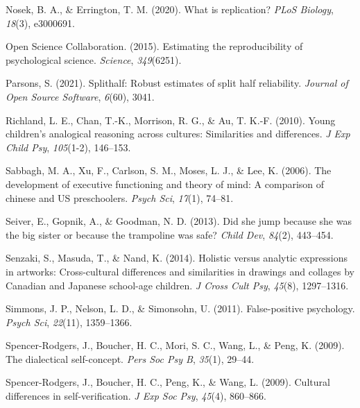\documentclass[
  man]{apa6}
\newlength{\cslhangindent}
\newlength{\cslentryspacingunit} %
\newenvironment{CSLReferences}[2] %
 {%
  \setlength{\parindent}{0pt}
  \ifodd #1
  \let\oldpar\par
  \def\par{\hangindent=\cslhangindent\oldpar}
  \fi
  \setlength{\parskip}{#2\cslentryspacingunit}
 }%
 {}
\begin{document}
\begin{CSLReferences}{1}{0}
\leavevmode{}%
Nosek, B. A., \& Errington, T. M. (2020). What is replication? \emph{PLoS Biology}, \emph{18}(3), e3000691.

\leavevmode{}%
Open Science Collaboration. (2015). Estimating the reproducibility of psychological science. \emph{Science}, \emph{349}(6251).

\leavevmode{}%
Parsons, S. (2021). Splithalf: Robust estimates of split half reliability. \emph{Journal of Open Source Software}, \emph{6}(60), 3041.

\leavevmode{}%
Richland, L. E., Chan, T.-K., Morrison, R. G., \& Au, T. K.-F. (2010). Young children's analogical reasoning across cultures: Similarities and differences. \emph{J Exp Child Psy}, \emph{105}(1-2), 146--153.

\leavevmode{}%
Sabbagh, M. A., Xu, F., Carlson, S. M., Moses, L. J., \& Lee, K. (2006). The development of executive functioning and theory of mind: A comparison of chinese and US preschoolers. \emph{Psych Sci}, \emph{17}(1), 74--81.

\leavevmode{}%
Seiver, E., Gopnik, A., \& Goodman, N. D. (2013). Did she jump because she was the big sister or because the trampoline was safe? \emph{Child Dev}, \emph{84}(2), 443--454.

\leavevmode{}%
Senzaki, S., Masuda, T., \& Nand, K. (2014). Holistic versus analytic expressions in artworks: Cross-cultural differences and similarities in drawings and collages by {C}anadian and {J}apanese school-age children. \emph{J Cross Cult Psy}, \emph{45}(8), 1297--1316.

\leavevmode{}%
Simmons, J. P., Nelson, L. D., \& Simonsohn, U. (2011). False-positive psychology. \emph{Psych Sci}, \emph{22}(11), 1359--1366.

\leavevmode{}%
Spencer-Rodgers, J., Boucher, H. C., Mori, S. C., Wang, L., \& Peng, K. (2009). The dialectical self-concept. \emph{Pers Soc Psy B}, \emph{35}(1), 29--44.

\leavevmode{}%
Spencer-Rodgers, J., Boucher, H. C., Peng, K., \& Wang, L. (2009). Cultural differences in self-verification. \emph{J Exp Soc Psy}, \emph{45}(4), 860--866.


\end{CSLReferences}
\end{document}
